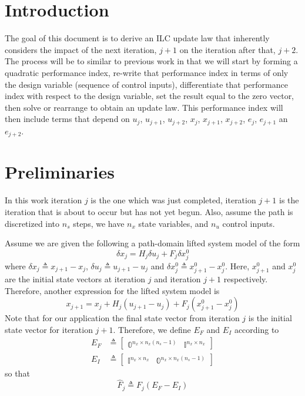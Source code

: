 \documentclass[landscape]{article}
\begin{document}
\section{Introduction}
The goal of this document is to derive an ILC update law that inherently considers the impact of the next iteration, $j+1$ on the iteration after that, $j+2$.  The process will be to similar to previous work in that we will start by forming a quadratic performance index, re-write that performance index in terms of only the design variable (sequence of control inputs), differentiate that performance index with respect to the design variable, set the result equal to the zero vector, then solve or rearrange to obtain an update law.  This performance index will then include terms that depend on $u_j$, $u_{j+1}$, $u_{j+2}$, $x_j$, $x_{j+1}$, $x_{j+2}$, $e_j$, $e_{j+1}$ an $e_{j+2}$.

\section{Preliminaries}

In this work iteration $j$ is the one which was just completed, iteration $j+1$ is the iteration that is about to occur but has not yet begun.  Also, assume the path is discretized into $n_s$ steps, we have $n_x$ state variables, and $n_u$ control inputs.

Assume we are given the following a path-domain lifted system model of the form
\begin{equation}
\delta x_j = H_j \delta u_j + F_j \delta x_j^0
\end{equation}
where $\delta x_j \triangleq x_{j+1} - x_j$, $\delta u_j \triangleq u_{j+1} - u_j$ and $\delta x_j^0 \triangleq x^0_{j+1} - x^0_j$.  Here, $x^0_{j+1}$ and $x^0_j$ are the initial state vectors at iteration $j$ and iteration $j+1$ respectively.  Therefore, another expression for the lifted system model is
\begin{equation}
x_{j+1} = x_j + H_j \left(u_{j+1} - u_j\right) + F_j \left(x^0_{j+1} - x^0_j\right)
\end{equation}
  Note that for our application the final state vector from iteration $j$ is the initial state vector for iteration $j+1$.  Therefore, we define $E_F$ and $E_I$ according to
  \begin{align}
  E_F &\triangleq \begin{bmatrix} \mathbb{0}^{n_x \times n_x(n_s-1)} & \mathbb{I}^{n_x \times n_x} \end{bmatrix} \\
  E_I &\triangleq \begin{bmatrix} \mathbb{I}^{n_x \times n_x}        & \mathbb{0}^{n_x \times n_x(n_s-1)}\end{bmatrix} 
  \end{align}
  so that 
\begin{equation}
\hat{F}_j \triangleq F_j \left(E_F-E_I\right)
\end{equation}
\end{document}
